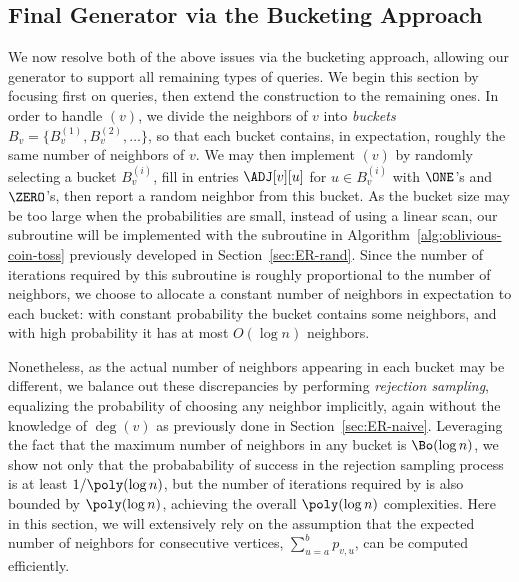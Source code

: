 \subsection{Final Generator via the Bucketing Approach}
\label{sec:buckets}

We now resolve both of the above issues via the bucketing approach, allowing our generator to support all remaining types of queries.
We begin this section by focusing first on  queries, then extend the construction to the remaining ones. In order to handle $(v)$,
we divide the neighbors of $v$ into \emph{buckets} $B_v = \{ B_v^{(1)}, B_v^{(2)},\ldots\}$,
so that each bucket contains, in expectation, roughly the same number of neighbors of $v$.
We may then implement $(v)$ by randomly selecting a bucket $B_v^{(i)}$,
fill in entries $\ADJ[v][u]$ for $u \in B_v^{(i)}$ with $\ONE$'s and $\ZERO$'s, then report a random neighbor from this bucket.
As the bucket size may be too large when the probabilities are small, instead of using a linear scan, our  subroutine will be implemented with the  subroutine in Algorithm~\ref{alg:oblivious-coin-toss} previously developed in Section~\ref{sec:ER-rand}.
Since the number of iterations required by this subroutine is roughly proportional to the number of neighbors, we choose to allocate a constant number of neighbors in expectation to each bucket: with constant probability the bucket contains some neighbors, and with high probability it has at most $O(\log n)$ neighbors.

Nonetheless, as the actual number of neighbors appearing in each bucket may be different, we balance out these discrepancies by performing \emph{rejection sampling}, equalizing the probability of choosing any neighbor implicitly, again without the knowledge of $\deg(v)$ as previously done in Section~\ref{sec:ER-naive}.
Leveraging the fact that the maximum number of neighbors in any bucket is $\Bo(\log n)$, we show not only that the probabability of success in the rejection sampling process is at least $1/\poly(\log n)$, but the number of iterations required by  is also bounded by $\poly(\log n)$, achieving the overall $\poly(\log n)$ complexities.
Here in this section, we will extensively rely on the assumption that the expected number of neighbors for consecutive vertices, $\sum_{u=a}^b p_{v,u}$, can be computed efficiently.

